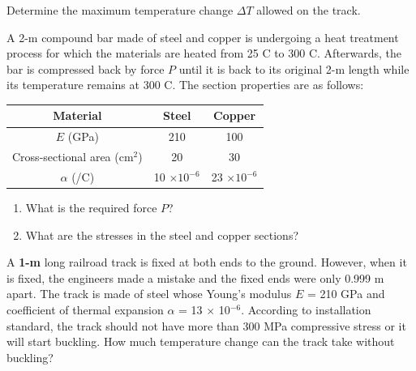 \documentclass[
fontsize=10pt,
a4paper,
twosides=false,
open=any,
svgnames,
]{kaobook} %
\begin{document}
\begin{exercises}
  \begin{figure}[H]
    \centering
  \end{figure}
  
  Determine the maximum temperature change $\Delta T$ allowed on the track.
	
\item A 2-m compound bar made of steel and copper is undergoing a heat treatment process for which the materials are heated from 25 C to 300 C. Afterwards, the bar is compressed back by force $P$ until it is back to its original 2-m length while its temperature remains at 300 C. The section properties are as follows:
  
  \begin{table}
    \centering
    \begin{tabular}{ c c c }
      \toprule
      Material	&		Steel	&		Copper \\
      \midrule
      $E$ (GPa)	&	210	&	100	\\
      Cross-sectional area (cm$^2$)	&	20	& 30 \\
      $\alpha$ (/C)	&	10 $\times 10^{-6}$	& 23 $\times 10^{-6}$ \\
      \bottomrule
    \end{tabular}
  \end{table}
  
  \begin{enumerate}
  \item What is the required force $P$?
  \item What are the stresses in the steel and copper sections?
  \end{enumerate}
  
\item A \textbf{1-m} long railroad track is fixed at both ends to the ground. However, when it is fixed, the engineers made a mistake and the fixed ends were only 0.999 m apart. The track is made of steel whose Young's modulus $E$ = 210 GPa and coefficient of thermal expansion $\alpha$ = 13 $\times$ 10$^{-6}$. According to installation standard, the track should  not have more than 300 MPa compressive stress or it will start buckling. How much temperature change can the track take without buckling?


\end{exercises}
\end{document}
